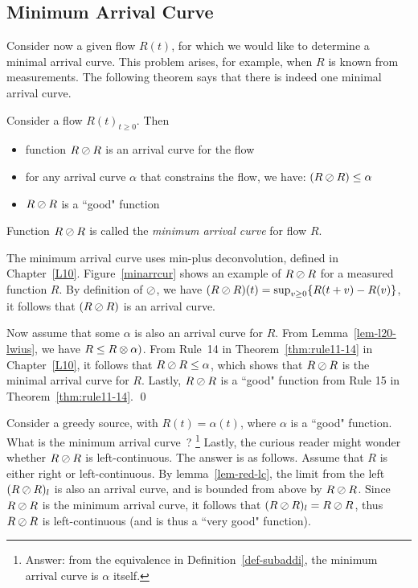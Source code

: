 \subsection{Minimum Arrival Curve}
Consider now a given flow $R(t)$, for which we would like to
determine a minimal arrival curve. This problem arises, for
example, when $R$ is known from measurements. The following
theorem says that there is indeed one minimal arrival curve.
\begin{theorem}
    Consider a flow $R(t)_{t \geq 0}$. Then
    \begin{itemize}
        \item  function $R \oslash R$ is an arrival curve for the flow
        \item  for any arrival curve $\alpha$ that constrains the flow, we
        have: $(R \oslash R) \leq \alpha$
        \item  $R \oslash R$ is a ``good" function
    \end{itemize}
    Function $R \oslash R$ is called the \emph{minimum arrival curve}
    for flow $R$.
\end{theorem}
The minimum arrival curve uses min-plus deconvolution, defined in
Chapter~\ref{L10}. Figure~\ref{minarrcur} shows an example of $R
\oslash R$ for a measured function $R$.
\pr
By definition of $\oslash$, we have
 $(R\oslash R)(t)
= \sup_{v \geq 0} \{ R(t+v) -R(v) \}$, it follows that $(R \oslash
R)$ is an arrival curve.

Now assume that some $\alpha$ is also an arrival curve for $R$.
From Lemma~\ref{lem-l20-lwius}, we have $R \leq R \otimes \alpha)$.
From Rule~14 in Theorem~\ref{thm:rule11-14} in Chapter~\ref{L10},
it follows that $R \oslash R \leq \alpha$, which shows that $R\oslash R$
is the minimal arrival curve for $R$. Lastly, $R\oslash R$ is a
``good" function from Rule 15 in  Theorem~\ref{thm:rule11-14}.
\qed

\begin{figure}[!htbp]
\end{figure}
Consider a greedy source, with $R(t)=\alpha(t)$, where $\alpha$ is
a ``good" function. What is the minimum arrival curve~?%
\footnote{Answer: from the equivalence in
Definition~\ref{def-subaddi}, the minimum arrival curve is
$\alpha$ itself.} Lastly, the curious reader might wonder whether
$R \oslash R$ is left-continuous. The answer is as follows. Assume
that $R$ is either right or left-continuous. By
lemma~\ref{lem-red-lc}, the limit from the left $(R \oslash R)_l$ is
also an arrival curve, and is bounded from above by $R \oslash R$.
Since $R \oslash R$ is the minimum arrival curve, it follows that $(R
\oslash R)_l=R \oslash R$, thus $R \oslash R$ is left-continuous (and is
thus a ``very good" function).

